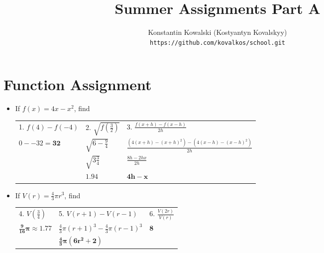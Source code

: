 \documentclass[a4paper]{article}
\begin{document}
   \title{Summer Assignments Part A} 
   \author{ Konstantin Kowalski (Kostyantyn Kovalskyy) \\ \texttt{https://github.com/kovalkos/school.git} }
   \maketitle

   \section{Function Assignment}

   \begin{itemize} \itemsep 3em

   \item
      If $ f(x) = 4x-x^2 $, find

      \begin{tabular}{ p{5cm} p{5cm} p{5cm} }
         1. $ f(4)-f(-4)                  $&
         2. $ \sqrt{ f( \frac{3}{2} ) }   $&
         3. $ \frac{ f(x+h)-f(x-h) }{ 2h }$
      \\
         $ 0 - -32 = \bm{32}              $&
         $ \sqrt{ 6 - \frac{9}{4} }       $&
         $ \frac{ (4(x+h)-(x+h)^2) - (4(x-h) - (x-h)^2) }{ 2h } $
      \\
                                           &
         $ \sqrt{ 3 \frac{3}{4} }         $&
         $ \frac{ 8h - 2hx }{ 2h }        $
      \\
                                           & 
         $ \bm{1.94}                      $&
         $ \bm{4h-x}                      $
      \end{tabular}

   \item
      If $ V(r) = \frac{4}{3} \pi r^3 $, find
        
      \begin{tabular}{ p{5cm} p{5cm} p{5cm} }
         4. $ V( \frac{3}{4} )            $&
         5. $ V(r+1)-V(r-1)               $&
         6. $ \frac{ V(2r) }{ V(r) }      $
      \\
         $ \bm{ \frac{9}{16} \pi \approx 1.77 }                $&
         $ \frac{4}{3} \pi (r+1)^3 - \frac{4}{3} \pi (r-1)^3   $&
         $ \bm{8}                                              $
      \\
                                                                &
         $ \bm{ \frac{4}{3} \pi (6r^2 + 2) }                   $
      \end{tabular}
      

\end{itemize}
\end{document}
